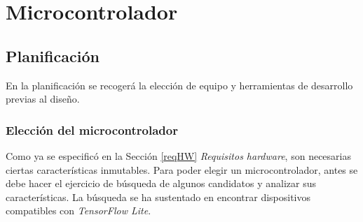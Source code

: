 \chapter{Microcontrolador}
\section{Planificación}
En la planificación se recogerá la elección de equipo y herramientas de desarrollo
previas al diseño.
\subsection{Elección del microcontrolador}
Como ya se especificó en la Sección \ref{reqHW} \textit{Requisitos hardware},
son necesarias ciertas características inmutables. Para poder elegir un
microcontrolador, antes se debe hacer el ejercicio de búsqueda de algunos
candidatos y analizar sus características. La búsqueda se ha sustentado
en encontrar dispositivos compatibles con \textit{TensorFlow Lite}.
